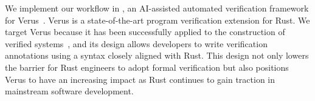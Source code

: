 We implement our workflow in \toolname{}, an AI-assisted automated verification framework for Verus~\cite{verus,verus-practical}.  Verus is a state-of-the-art program verification extension for Rust. We target Verus because it has been successfully applied to the construction of verified systems~\cite{verus-practical}, and its design allows developers to write verification annotations using a syntax closely aligned with Rust. This design not only lowers the barrier for Rust engineers to adopt formal verification but also positions Verus to have an increasing impact as Rust continues to gain traction in mainstream software development. 











